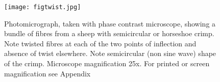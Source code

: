 %

\begin{figure}[!h]
  \centering
  \texttt{[image: figtwist.jpg]}
  \caption{Photomicrograph, taken with phase contrast microscope, showing a bundle of fibres from a sheep with semicircular or horseshoe crimp. Note twisted fibres at each of the two points of inflection and absence of twist elsewhere. Note semicircular (non sine wave) shape of the crimp. Microscope magnification 25x. For printed or screen magnification see Appendix }
  \label{fig:twist}
\end{figure}

%

